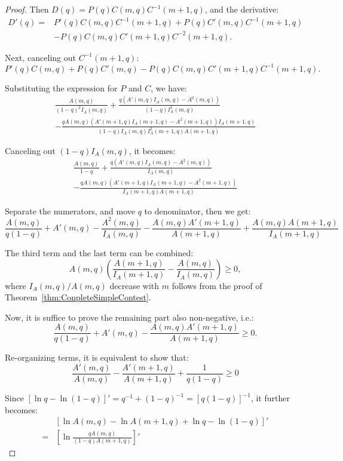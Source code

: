 \begin{proof}
    Then $D(q)=P(q)C(m,q)C^{-1}(m+1,q)$, and the derivative:
    \[
    \begin{aligned}
        D'(q) = & P'(q)C(m,q)C^{-1}(m+1,q)+P(q)C'(m,q)C^{-1}(m+1,q)\\
                & -P(q)C(m,q)C'(m+1,q)C^{-2}(m+1,q).
    \end{aligned}
    \]

    Next, canceling out $C^{-1}(m+1,q)$:
    \[
    P'(q)C(m,q) + P(q)C'(m,q)-P(q)C(m,q)C'(m+1,q)C^{-1}(m+1,q).
    \]

    Substituting the expression for $P$ and $C$, we have:
    \begin{multline*}
        \frac{A(m,q)}{(1-q)^2I_A(m,q)} + \frac{q(A'(m,q)I_A(m,q)-A^2(m,q))}{(1-q)I^2_A(m,q)} \\
        -\frac{qA(m,q)(A'(m+1,q)I_A(m+1,q)-A^2(m+1,q))I_A(m+1,q)}{(1-q)I_A(m,q)I^2_A(m+1,q)A(m+1,q)}
    \end{multline*}

    Canceling out $(1-q)I_A(m,q)$, it becomes:
    \begin{multline*}
        \frac{A(m,q)}{1-q}+\frac{q(A'(m,q)I_A(m,q)-A^2(m,q))}{I_A(m,q)} \\
        - \frac{qA(m,q)(A'(m+1,q)I_A(m+1,q)-A^2(m+1,q))}{I_A(m+1,q)A(m+1,q)}
    \end{multline*}

    Separate the numerators, and move $q$ to denominator, then we get:
    \[
    \frac{A(m,q)}{q(1-q)} + A'(m,q)-\frac{A^2(m,q)}{I_A(m,q)}-\frac{A(m,q)A'(m+1,q)}{A(m+1,q)}+\frac{A(m,q)A(m+1,q)}{I_A(m+1,q)}
    \]

    The third term and the last term can be combined:
    \[
    A(m,q)\left( \frac{A(m+1,q)}{I_A(m+1,q)}-\frac{A(m,q)}{I_A(m,q)}\right) \geq 0,
    \]where $I_A(m,q)/A(m,q)$ decrease with $m$ follows from the proof of Theorem~\ref{thm:ConpleteSimpleContest}.  

    Now, it is suffice to prove the remaining part also non-negative, i.e.:
    \[
    \frac{A(m,q)}{q(1-q)} + A'(m,q) - \frac{A(m,q)A'(m+1,q)}{A(m+1,q)} \geq 0.
    \]

    Re-organizing terms, it is equivalent to show that:
    \[
    \frac{A'(m,q)}{A(m,q)} - \frac{A'(m+1,q)}{A(m+1,q)} + \frac{1}{q(1-q)} \geq 0
    \]

    Since $[\ln q - \ln (1-q)]' = q^{-1}+(1-q)^{-1} = [q(1-q)]^{-1}$, it further becomes:
    \[
    \begin{aligned}
        & [\ln A(m,q)-\ln A(m+1,q)+\ln q-\ln(1-q)]' \\
        = & \left [ \ln \frac{qA(m,q)}{(1-q)A(m+1,q)}\right]'
    \end{aligned}
    \]


\end{proof}
